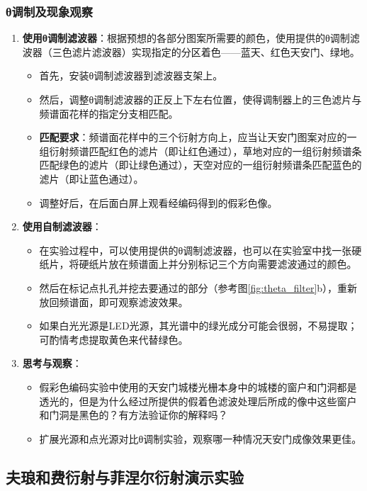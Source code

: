 \documentclass[11pt]{article}
\begin{document}
\subsubsection{θ调制及现象观察}
\begin{enumerate}
    \item \textbf{使用θ调制滤波器}：根据预想的各部分图案所需要的颜色，使用提供的θ调制滤波器（三色滤片滤波器）实现指定的分区着色——蓝天、红色天安门、绿地。
    \begin{itemize}
        \item 首先，安装θ调制滤波器到滤波器支架上。
        \item 然后，调整θ调制滤波器的正反上下左右位置，使得调制器上的三色滤片与频谱面花样的指定分支相匹配。
        \item \textbf{匹配要求}：频谱面花样中的三个衍射方向上，应当让天安门图案对应的一组衍射频谱匹配红色的滤片（即让红色通过），草地对应的一组衍射频谱条匹配绿色的滤片（即让绿色通过），天空对应的一组衍射频谱条匹配蓝色的滤片（即让蓝色通过）。
        \item 调整好后，在后面白屏上观看经编码得到的假彩色像。
    \end{itemize}
    \item \textbf{使用自制滤波器}：
    \begin{itemize}
        \item 在实验过程中，可以使用提供的θ调制滤波器，也可以在实验室中找一张硬纸片，将硬纸片放在频谱面上并分别标记三个方向需要滤波通过的颜色。
        \item 然后在标记点扎孔并挖去要通过的部分（参考图\ref{fig:theta_filter}b），重新放回频谱面，即可观察滤波效果。
        \item 如果白光光源是LED光源，其光谱中的绿光成分可能会很弱，不易提取；可酌情考虑提取黄色来代替绿色。
    \end{itemize}
    \item \textbf{思考与观察}：
    \begin{itemize}
        \item 假彩色编码实验中使用的天安门城楼光栅本身中的城楼的窗户和门洞都是透光的，但是为什么经过所提供的假着色滤波处理后所成的像中这些窗户和门洞是黑色的？有方法验证你的解释吗？
        \item 扩展光源和点光源对比θ调制实验，观察哪一种情况天安门成像效果更佳。
    \end{itemize}
\end{enumerate}

\subsection{夫琅和费衍射与菲涅尔衍射演示实验}
\end{document}
